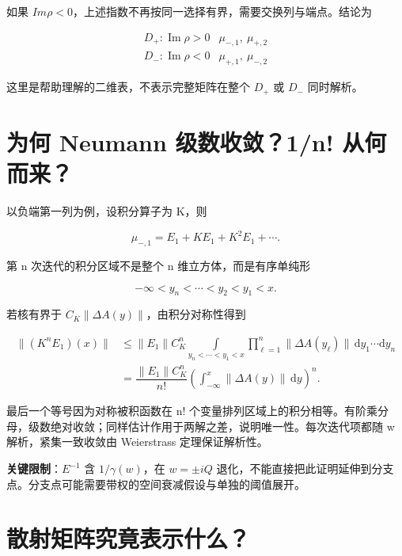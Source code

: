 如果 $Im\rho{}<0$，上述指数不再按同一选择有界，需要交换列与端点。结论为\par

\[
\begin{array}{c|c}
D_+:\operatorname{Im}\rho>0 & \mu_{-,1},\ \mu_{+,2}\\
D_-:\operatorname{Im}\rho<0 & \mu_{+,1},\ \mu_{-,2}
\end{array}
\]

这里是帮助理解的二维表，不表示完整矩阵在整个 $D_{+}$ 或 $D_{-}$ 同时解析。\par

\section{为何 Neumann 级数收敛？1/n! 从何而来？}

以负端第一列为例，设积分算子为 K，则\par

\[
\mu_{-,1}=E_1+KE_1+K^2E_1+\cdots.
\]

第 n 次迭代的积分区域不是整个 n 维立方体，而是有序单纯形\par

\[
-\infty<y_n<\cdots<y_2<y_1<x.
\]

若核有界于 $C_K\parallel{}\Delta{}A(y)\parallel{}$，由积分对称性得到\par

\[
\begin{aligned}
\|(K^nE_1)(x)\|
&\le\|E_1\|C_K^n
\int\limits_{y_n<\cdots<y_1<x}
\prod\limits_{\ell=1}^{n}\|\Delta A(y_\ell)\|
\,\mathrm{d}y_1\cdots\mathrm{d}y_n\\
&=\dfrac{\|E_1\|C_K^n}{n!}
\left(\int_{-\infty}^{x}\|\Delta A(y)\|\,\mathrm{d}y\right)^n.
\end{aligned}
\]

最后一个等号因为对称被积函数在 n! 个变量排列区域上的积分相等。有阶乘分母，级数绝对收敛；同样估计作用于两解之差，说明唯一性。每次迭代项都随 w 解析，紧集一致收敛由 Weierstrass 定理保证解析性。\par

\textbf{关键限制}：$E^{-1}$ 含 $1/\gamma{}(w)$，在 $w=\pm{}iQ$ 退化，不能直接把此证明延伸到分支点。分支点可能需要带权的空间衰减假设与单独的阈值展开。\par

\section{散射矩阵究竟表示什么？}
\par

